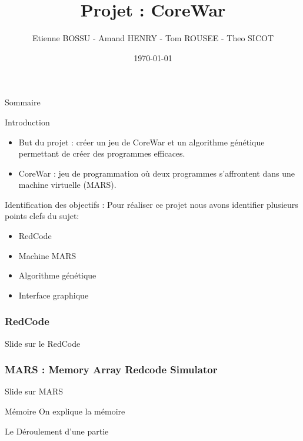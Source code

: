 \documentclass{beamer}
\title{Projet : CoreWar}
\author{Etienne BOSSU - Amand HENRY - Tom ROUSEE - Theo SICOT}
\date{\today}
\begin{document}
\begin{frame}
    \titlepage
\end{frame}

\begin{frame}{Sommaire}
    \tableofcontents
    
    
\end{frame}

\begin{frame}{Introduction}
    \begin{itemize}
        \item But du projet : créer un jeu de CoreWar et un algorithme génétique permettant de créer des programmes efficaces.
        \vspace{\baselineskip}
        \item CoreWar : jeu de programmation où deux programmes s'affrontent dans une machine virtuelle (MARS).
    \end{itemize}
\end{frame}

\begin{frame}{Identification des objectifs :}
    Pour réaliser ce projet nous avons identifier plusieurs points clefs  du sujet:
    \vspace{\baselineskip}
    \begin{itemize}
        \item RedCode
        \item Machine MARS
        \item Algorithme génétique
        \item Interface graphique
    \end{itemize}
\end{frame}

\begin{frame}
    \frametitle{RedCode}
    Slide sur le RedCode
\end{frame}

\begin{frame}
    \frametitle{MARS : Memory Array Redcode Simulator}
    Slide sur MARS
\end{frame}

\begin{frame}{Mémoire}
    On explique la mémoire 
\end{frame}

\begin{frame}{Le Déroulement d'une partie}
    
\end{frame}
\end{document}

